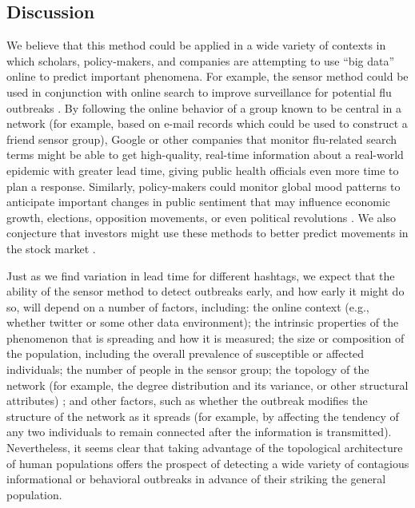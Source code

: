 \subsection*{Discussion}

We believe that this method could be applied in a wide variety of contexts in which scholars, policy-makers, and companies are attempting to use ``big data'' online to predict important phenomena.  For example, the sensor method could be used in conjunction with online search to improve surveillance for potential flu outbreaks \cite{8,22}.  By following the online behavior of a group known to be central in a network (for example, based on e-mail records which could be used to construct a friend sensor group), Google or other companies that monitor flu-related search terms might be able to get high-quality, real-time information about a real-world epidemic with greater lead time, giving public health officials even more time to plan a response.  Similarly, policy-makers could monitor global mood patterns \cite{12} to anticipate important changes in public sentiment that may influence economic growth, elections, opposition movements, or even political revolutions \cite{14}.  We also conjecture that investors might use these methods to better predict movements in the stock market \cite{13}. 

Just as we find variation in lead time for different hashtags, we expect that the ability of the sensor method to detect outbreaks early, and how early it might do so, will depend on a number of factors, including: the online context (e.g., whether twitter or some other data environment); the intrinsic properties of the phenomenon that is spreading and how it is measured; the size or composition of the population, including the overall prevalence of susceptible or affected individuals; the number of people in the sensor group; the topology of the network (for example, the degree distribution and its variance, or other structural attributes) \cite{23}; and other factors, such as whether the outbreak modifies the structure of the network as it spreads (for example, by affecting the tendency of any two individuals to remain connected after the information is transmitted).  Nevertheless, it seems clear that taking advantage of the topological architecture of human populations offers the prospect of detecting a wide variety of contagious informational or behavioral outbreaks in advance of their striking the general population.


